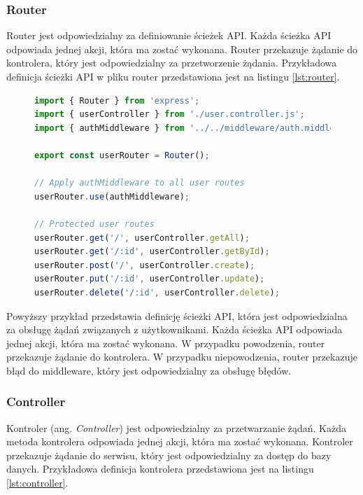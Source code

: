
\subsubsection{Router}
Router jest odpowiedzialny za definiowanie ścieżek API. Każda ścieżka API odpowiada jednej akcji, która ma zostać wykonana. Router przekazuje żądanie do kontrolera, który jest odpowiedzialny za przetworzenie żądania. Przykładowa definicja ścieżki API w pliku router przedstawiona jest na listingu \ref{lst:router}.

\begin{figure}[H]
\begin{lstlisting}[language=JavaScript, caption=Przykładowa definicja ścieżki API, label=lst:router]
import { Router } from 'express';
import { userController } from './user.controller.js';
import { authMiddleware } from '../../middleware/auth.middleware.js';

export const userRouter = Router();

// Apply authMiddleware to all user routes
userRouter.use(authMiddleware);

// Protected user routes
userRouter.get('/', userController.getAll);
userRouter.get('/:id', userController.getById);
userRouter.post('/', userController.create);
userRouter.put('/:id', userController.update);
userRouter.delete('/:id', userController.delete);
\end{lstlisting}
\end{figure}

Powyższy przykład przedstawia definicję ścieżki API, która jest odpowiedzialna za obsługę żądań związanych z użytkownikami. Każda ścieżka API odpowiada jednej akcji, która ma zostać wykonana. W przypadku powodzenia, router przekazuje żądanie do kontrolera. W przypadku niepowodzenia, router przekazuje błąd do middleware, który jest odpowiedzialny za obsługę błędów.

\subsubsection{Controller}
Kontroler (ang. \textit{Controller}) jest odpowiedzialny za przetwarzanie żądań. Każda metoda kontrolera odpowiada jednej akcji, która ma zostać wykonana. Kontroler przekazuje żądanie do serwisu, który jest odpowiedzialny za dostęp do bazy danych. Przykładowa definicja kontrolera przedstawiona jest na listingu \ref{lst:controller}.


